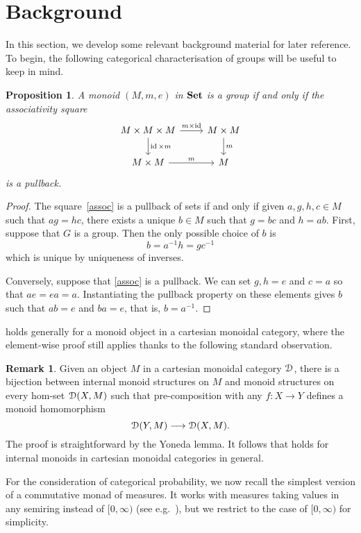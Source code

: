 \documentclass[a4paper,UKenglish,numberwithinsect,cleveref, autoref, thm-restate]{lipics-v2021}
\theoremstyle{plain} %
\newtheorem{myproposition}[mytheorem]{Proposition}
\theoremstyle{definition} %
\newtheorem{myremark}[mytheorem]{Remark}
\begin{document}
\section{Background}
\label{secbackground}

In this section, we develop some relevant background material for later reference.
To begin, the following categorical characterisation of groups will be useful to keep in mind.
\begin{myproposition}\label{assoc_group}
 A monoid $(M,m,e)$ in $\mathbf{Set}$ is a group if and only if the associativity square
 \begin{equation}\label{assoc}
  \begin{tikzcd}
   M \times M \times M \ar{d}{\id\times m} \ar{r}{m\times\id} & M\times M \ar{d}{m} \\
   M\times M \ar{r}{m} & M
  \end{tikzcd}
 \end{equation}
 is a pullback.
\end{myproposition}
\begin{proof}
 The square~\eqref{assoc} is a pullback of sets if and only if given $a,g,h,c\in M$ such that $ag=hc$, there exists a unique $b\in M$ such that $g=bc$ and $h=ab$.
 First, suppose that $G$ is a group. Then the only possible choice of $b$ is 
 \[
  b = a^{-1}h = gc^{-1}
 \]
 which is unique by uniqueness of inverses. 
 
 Conversely, suppose that \eqref{assoc} is a pullback. We can set $g,h=e$ and $c=a$ so that $ae=ea=a$. 
 Instantiating the pullback property on these elements gives $b$ such that $ab=e$ and $ba=e$, that is, $b=a^{-1}$.
\end{proof}
%
 holds generally for a monoid object in a cartesian monoidal category, where the element-wise proof still applies thanks to the following standard observation.

\begin{myremark}
\label{yonedaremark}
	Given an object $M$ in a cartesian monoidal category $\mathcal{D}$, there is a bijection between internal monoid structures on $M$ and monoid structures on every hom-set $\mathcal{D}(X, M)$ such that pre-composition with any $f : X \to Y$ defines a monoid homomorphism
	\[
		\mathcal{D}(Y, M) \longrightarrow \mathcal{D}(X, M).
	\]
	The proof is straightforward by the Yoneda lemma.
	It follows that  holds for internal monoids in cartesian monoidal categories in general.
\end{myremark}
%
For the consideration of categorical probability, we now recall the simplest version of a commutative monad of measures.
It works with measures taking values in any semiring instead of $[0,\infty)$ (see e.g.~\cite[Section~5.1]{coumans2013scalars}), 
but we restrict to the case of $[0,\infty)$ for simplicity.
\end{document}

